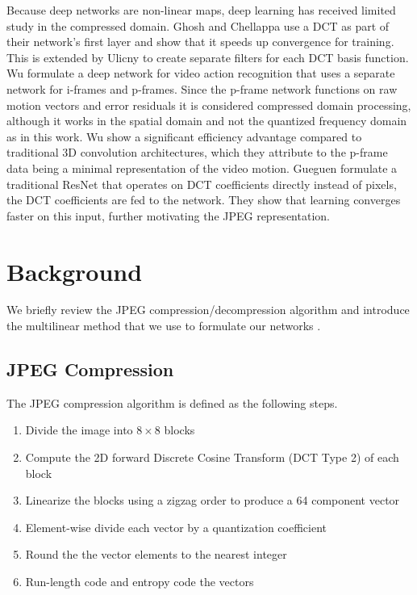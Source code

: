 \documentclass[10pt,twocolumn,letterpaper]{article}
\begin{document}
Because deep networks are non-linear maps, deep learning has received limited study in the compressed domain. Ghosh and Chellappa \cite{ghosh2016deep} use a DCT as part of their network's first layer and show that it speeds up convergence for training. This is extended by Ulicny \etal\cite{ulicny2018harmonic} to create separate filters for each DCT basis function. Wu \etal\cite{wu2018compressed} formulate a deep network for video action recognition that uses a separate network for i-frames and p-frames. Since the p-frame network functions on raw motion vectors and error residuals it is considered compressed domain processing, although it works in the spatial domain and not the quantized frequency domain as in this work. Wu \etal show a significant efficiency advantage compared to traditional 3D convolution architectures, which they attribute to the p-frame data being a minimal representation of the video motion. Gueguen \etal\cite{gueguen_2018_ICLR} formulate a traditional ResNet that operates on DCT coefficients directly instead of pixels, \eg the DCT coefficients are fed to the network. They show that learning converges faster on this input, further motivating the JPEG representation. \section{Background}

We briefly review the JPEG compression/decompression algorithm \cite{wallace1992jpeg} and introduce the multilinear method that we use to formulate our networks \cite{smith1994fast}.

\subsection{JPEG Compression}

The JPEG compression algorithm is defined as the following steps.

\begin{enumerate}
    \item Divide the image into $8 \times 8$ blocks
    \item Compute the 2D forward Discrete Cosine Transform (DCT Type 2) of each block
    \item Linearize the blocks using a zigzag order to produce a 64 component vector
    \item Element-wise divide each vector by a quantization coefficient
    \item Round the the vector elements to the nearest integer
    \item Run-length code and entropy code the vectors
\end{enumerate}
\end{document}
